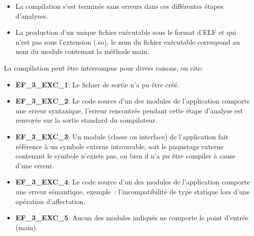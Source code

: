 {
\begin{itemize}
  	\item La compilation s'est terminée sans erreurs dans ces différentes étapes d’analyses.
  	\item La production d’un unique fichier exécutable sous le format d'ELF et qui n'est pas sous l'extension (.so), le nom du fichier exécutable correspond au nom du module contenant la méthode main.
\end {itemize}
  	} %
{                                                %
  
}{} %
{La compilation peut être interrompue pour divers raisons, on cite:

\begin{itemize}
  	\item \textbf {EF\_3\_EXC\_1}: Le fichier de sortie n'a pu être créé.
  	\item  \textbf {EF\_3\_EXC\_2}: Le code source d'un des modules de l'application comporte une erreur syntaxique, l'erreur rencontrée pendant cette étape d'analyse est renvoyée sur la sortie standard du compilateur.
  	\item \textbf {EF\_3\_EXC\_3}: Un module (classe ou interface) de l'application fait référence à un symbole externe introuvable, soit le paquetage externe contenant le symbole n'existe pas, ou bien il n'a pu être compiler à cause d'une erreur.
  	\item \textbf {EF\_3\_EXC\_4}: Le code source d'un des modules de l'application comporte une erreur sémantique, exemple : l'incompatibilité de type statique lors d'une opération d'affectation.
  	\item \textbf {EF\_3\_EXC\_5}: Aucun des modules indiqués ne comporte le point d'entrée (main).
  	\end {itemize}
 } %


